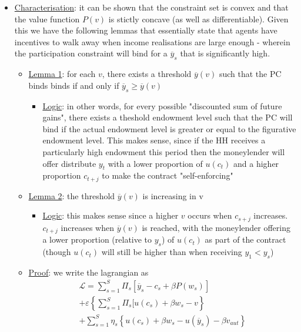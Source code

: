 \documentclass{article}
\begin{document}
\begin{itemize}
    \begin{itemize}
        \item  \underline{Characterisation}: it can be shown that the constraint set is convex and that the value function $P(v)$ is stictly concave (as well as differentiable). Given this we have the following lemmas that essentially state that agents have incentives to walk away when income realisations are large enough - wherein the participation constraint will bind for a $\overline{y}_{s}$ that is significantly high.
        \begin{itemize}
            \item \underline{Lemma 1}: for each $v$, there exists a threshold $\overline{y}(v)$ such that the PC binds binds if and only if $\overline{y}_{s} \geq \overline{y}(v)$
            \begin{itemize}
                \item  \underline{Logic}: in other words, for every possible "discounted sum of future gains", there exists a theshold endowment level such that the PC will bind if the actual endowment level is greater or equal to the figurative endowment level. This makes sense, since if the HH receives a particularly high endowment this period then the moneylender will offer distribute $y_{t}$ with a lower proportion of $u(c_{t})$ and a higher proportion $c_{t+j}$ to make the contract "self-enforcing"
            \end{itemize}
            \item  \underline{Lemma 2}: the threshold $\overline{y}(v)$ is increasing in v
            \begin{itemize}
                \item  \underline{Logic}: this makes sense since a higher $v$ occurs when $c_{s+j}$ increases. $c_{t+j}$ increases when $\overline{y}(v)$ is reached, with the moneylender offering a lower proportion (relative to $y_{s}$) of $u(c_{t})$ as part of the contract (though $u(c_{t})$ will still be higher than when receiving $y_{1} < y_{s}$)
            \end{itemize}
            \item  \underline{Proof}: we write the lagrangian as
            \begin{gather*}
                \mathcal{L} = \sum_{s=1}^{S} \Pi_{s} [\overline{y}_{s} - c_{s} + \beta P(w_{s})] \\ + \varepsilon \left\{ \sum_{s=1}^{S} \Pi_{s} [u(c_{s}) + \beta w_{s} - v \right\} \\ +  \sum_{s=1}^{S} \eta_{s} \left\{ u(c_{s}) + \beta w_{s} - u(\overline{y}_{s}) - \beta v_{aut} \right\}

\end{gather*}
\end{itemize}
\end{itemize}
\end{itemize}
\end{document}
